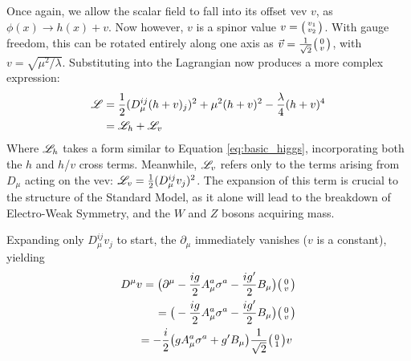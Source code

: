         Once again, we allow the scalar field to fall into its offset vev $v$, as $\phi(x) \rightarrow h(x) + v$.
        Now however, $v$ is a spinor value $v = \big(\begin{smallmatrix} v_1 \\ v_2 \end{smallmatrix}\big)$.
        With gauge freedom, this can be rotated entirely along one axis as $\vec{v} = \frac{1}{\sqrt{2}}\big(\begin{smallmatrix} 0 \\ v \end{smallmatrix}\big)$,
            with $v = \sqrt{\mu^2/\lambda}$.
        Substituting into the Lagrangian now produces a more complex expression:
        \begin{equation} \begin{split}
            \mathscr{L} & = \frac{1}{2} (D_{\mu}^{ij} (h+v)_j)^2
                + \mu^2 (h+v)^2
                - \frac{\lambda}{4} (h+v)^4 \\
             & = \mathscr{L}_h + \mathscr{L}_v
        \end{split} \end{equation}
        Where $\mathscr{L}_h$ takes a form similar to Equation \ref{eq:basic_higgs}, incorporating both the $h$ and $h$/$v$ cross terms.
        Meanwhile, $\mathscr{L}_v$ refers only to the terms arising from $D_{\mu}$ acting on the vev:
        $ \mathscr{L}_v = \frac{1}{2} (D_{\mu}^{ij} v_j)^2 $.
        The expansion of this term is crucial to the structure of the Standard Model,
            as it alone will lead to the breakdown of Electro-Weak Symmetry,
            and the $W$ and $Z$ bosons acquiring mass.

        Expanding only $D_{\mu}^{ij} v_j$ to start, the $\partial_{\mu}$ immediately vanishes ($v$ is a constant), yielding 
        \begin{equation} \begin{split}
            D^{\mu} v  = \big( \partial^{\mu} & - \frac{ig}{2} A^a_{\mu} \sigma^a - \frac{ig'}{2} B_{\mu} \big) \big(\begin{smallmatrix} 0\\v \end{smallmatrix}\big) \\
                = \big( & - \frac{ig}{2} A^a_{\mu} \sigma^a - \frac{ig'}{2} B_{\mu} \big) \big(\begin{smallmatrix} 0\\v \end{smallmatrix}\big) \\
                = - \frac{i}{2} \big( & g A^a_{\mu} \sigma^a + g' B_{\mu} \big) \frac{1}{\sqrt{2}}\big(\begin{smallmatrix} 0\\1 \end{smallmatrix}\big) v
        \end{split} \end{equation}

